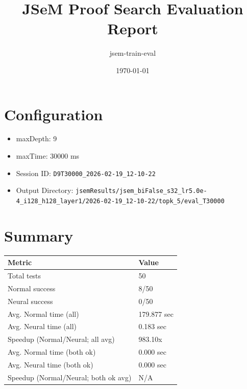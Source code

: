 \documentclass[a4paper,10pt]{article}
\title{JSeM Proof Search Evaluation Report}
\author{jsem-train-eval}
\date{\today}
\begin{document}
\maketitle

\section{Configuration}
\begin{itemize}
\item maxDepth: 9
\item maxTime: 30000 ms
\item Session ID: \texttt{D9T30000\_2026-02-19\_12-10-22}
\item Output Directory: \texttt{jsemResults/jsem\_biFalse\_s32\_lr5.0e-4\_i128\_h128\_layer1/2026-02-19\_12-10-22/topk\_5/eval\_T30000}
\end{itemize}

\section{Summary}
\begin{tabular}{ll}
\toprule
\textbf{Metric} & \textbf{Value} \\
\midrule
Total tests & 50 \\
Normal success & 8/50 \\
Neural success & 0/50 \\
\midrule
Avg. Normal time (all) & 179.877 sec \\
Avg. Neural time (all) & 0.183 sec \\
Speedup (Normal/Neural; all avg) & 983.10x \\
Avg. Normal time (both ok) & 0.000 sec \\
Avg. Neural time (both ok) & 0.000 sec \\
Speedup (Normal/Neural; both ok avg) & N/A \\
\bottomrule
\end{tabular}
\end{document}
